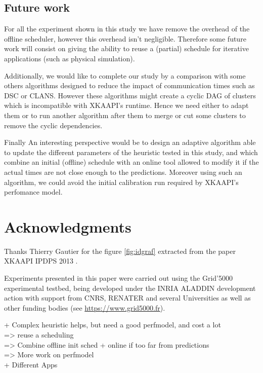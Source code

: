 \documentclass[10pt, conference, compsocconf,pdftex,dvipsnames]{IEEEtran}
\newcommand{\mytodo}[1]{\todo[inline]{#1}}
\begin{document}
\subsection{Future work }
\label{chap:cncl-work}

For all the experiment shown in this study we have remove the overhead of the
offline scheduler, however this overhead isn't negligible. Therefore some future
work will consist on giving the ability to reuse a (partial) schedule for
iterative applications (such as physical simulation).

Additionally, we would like to complete our study by a comparison with some
others algorithms designed to reduce the impact of communication times such as
DSC or CLANS. However these algorithms might create a cyclic DAG of clusters
which is incompatible with XKAAPI's runtime. Hence we need either to adapt
them or to run another algorithm after them to merge or cut some clusters to
remove the cyclic dependencies.

Finally An interesting perspective would be to design an adaptive algorithm
able to update the different parameters of the heuristic tested in this study,
and which combine an initial (offline) schedule with an online tool allowed to
modify it if the actual times are not close enough to the predictions. Moreover
using such an algorithm, we could avoid the initial calibration run required
by XKAAPI's perfomance model.

\section*{Acknowledgments}

Thanks Thierry Gautier for the figure \ref{fig:idgraf} extracted from the
paper XKAAPI IPDPS 2013 \cite{gautierxkaapi}.

Experiments presented in this paper were carried out using the Grid'5000
experimental testbed, being developed under the INRIA ALADDIN development 
action with support from CNRS, RENATER and several Universities as well 
as other funding bodies (see \url{https://www.grid5000.fr}).


+ Complex heuristic helps, but need a good perfmodel, and cost a lot
\\
=> reuse a scheduling 
\\
=> Combine offline init sched + online if too far from predictions
\\
=> More work on perfmodel
\\
+ Different Apps








\mytodo{Remove the todo list}
\listoftodos
\end{document}
